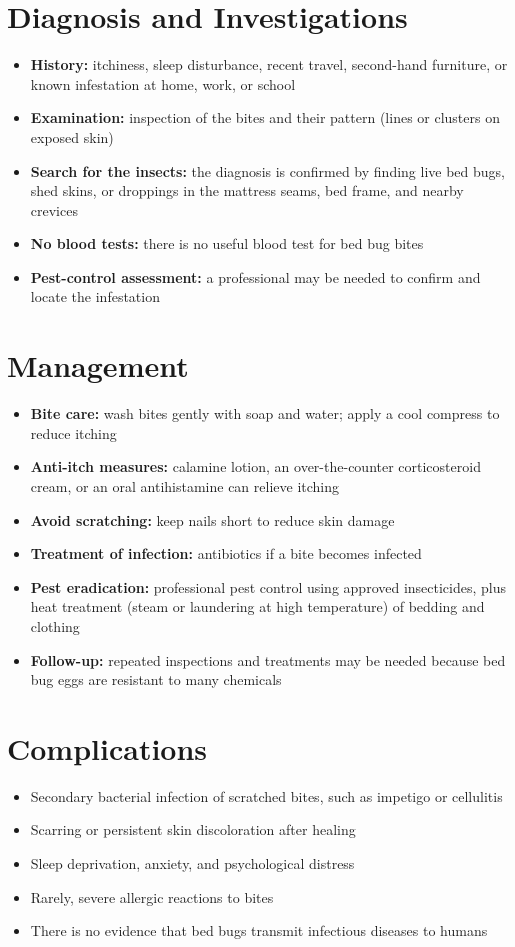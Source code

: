 \section*{Diagnosis and Investigations}
\begin{itemize}
    \item \textbf{History:} itchiness, sleep disturbance, recent travel, second-hand furniture, or known infestation at home, work, or school
    \item \textbf{Examination:} inspection of the bites and their pattern (lines or clusters on exposed skin)
    \item \textbf{Search for the insects:} the diagnosis is confirmed by finding live bed bugs, shed skins, or droppings in the mattress seams, bed frame, and nearby crevices
    \item \textbf{No blood tests:} there is no useful blood test for bed bug bites
    \item \textbf{Pest-control assessment:} a professional may be needed to confirm and locate the infestation
\end{itemize}

\section*{Management}
\begin{itemize}
    \item \textbf{Bite care:} wash bites gently with soap and water; apply a cool compress to reduce itching
    \item \textbf{Anti-itch measures:} calamine lotion, an over-the-counter corticosteroid cream, or an oral antihistamine can relieve itching
    \item \textbf{Avoid scratching:} keep nails short to reduce skin damage
    \item \textbf{Treatment of infection:} antibiotics if a bite becomes infected
    \item \textbf{Pest eradication:} professional pest control using approved insecticides, plus heat treatment (steam or laundering at high temperature) of bedding and clothing
    \item \textbf{Follow-up:} repeated inspections and treatments may be needed because bed bug eggs are resistant to many chemicals
\end{itemize}

\section*{Complications}
\begin{itemize}
    \item Secondary bacterial infection of scratched bites, such as impetigo or cellulitis
    \item Scarring or persistent skin discoloration after healing
    \item Sleep deprivation, anxiety, and psychological distress
    \item Rarely, severe allergic reactions to bites
    \item There is no evidence that bed bugs transmit infectious diseases to humans
\end{itemize}

